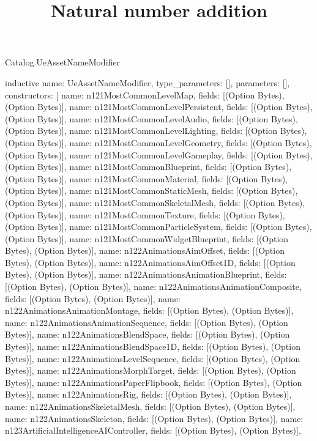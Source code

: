 \begin{lexlean}{Catalog.UeAssetNameModifier}
\title{Natural number addition}
\begin{semanticmodule}
inductive{
  name: UeAssetNameModifier,
  type_parameters: [],
  parameters: [],
  constructors: [
    {name: n121MostCommonLevelMap, fields: [(Option Bytes), (Option Bytes)]},
    {name: n121MostCommonLevelPersistent, fields: [(Option Bytes), (Option Bytes)]},
    {name: n121MostCommonLevelAudio, fields: [(Option Bytes), (Option Bytes)]},
    {name: n121MostCommonLevelLighting, fields: [(Option Bytes), (Option Bytes)]},
    {name: n121MostCommonLevelGeometry, fields: [(Option Bytes), (Option Bytes)]},
    {name: n121MostCommonLevelGameplay, fields: [(Option Bytes), (Option Bytes)]},
    {name: n121MostCommonBlueprint, fields: [(Option Bytes), (Option Bytes)]},
    {name: n121MostCommonMaterial, fields: [(Option Bytes), (Option Bytes)]},
    {name: n121MostCommonStaticMesh, fields: [(Option Bytes), (Option Bytes)]},
    {name: n121MostCommonSkeletalMesh, fields: [(Option Bytes), (Option Bytes)]},
    {name: n121MostCommonTexture, fields: [(Option Bytes), (Option Bytes)]},
    {name: n121MostCommonParticleSystem, fields: [(Option Bytes), (Option Bytes)]},
    {name: n121MostCommonWidgetBlueprint, fields: [(Option Bytes), (Option Bytes)]},
    {name: n122AnimationsAimOffset, fields: [(Option Bytes), (Option Bytes)]},
    {name: n122AnimationsAimOffset1D, fields: [(Option Bytes), (Option Bytes)]},
    {name: n122AnimationsAnimationBlueprint, fields: [(Option Bytes), (Option Bytes)]},
    {name: n122AnimationsAnimationComposite, fields: [(Option Bytes), (Option Bytes)]},
    {name: n122AnimationsAnimationMontage, fields: [(Option Bytes), (Option Bytes)]},
    {name: n122AnimationsAnimationSequence, fields: [(Option Bytes), (Option Bytes)]},
    {name: n122AnimationsBlendSpace, fields: [(Option Bytes), (Option Bytes)]},
    {name: n122AnimationsBlendSpace1D, fields: [(Option Bytes), (Option Bytes)]},
    {name: n122AnimationsLevelSequence, fields: [(Option Bytes), (Option Bytes)]},
    {name: n122AnimationsMorphTarget, fields: [(Option Bytes), (Option Bytes)]},
    {name: n122AnimationsPaperFlipbook, fields: [(Option Bytes), (Option Bytes)]},
    {name: n122AnimationsRig, fields: [(Option Bytes), (Option Bytes)]},
    {name: n122AnimationsSkeletalMesh, fields: [(Option Bytes), (Option Bytes)]},
    {name: n122AnimationsSkeleton, fields: [(Option Bytes), (Option Bytes)]},
    {name: n123ArtificialIntelligenceAIController, fields: [(Option Bytes), (Option Bytes)]},
}
\end{semanticmodule}
\end{lexlean}
